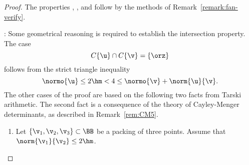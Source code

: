 \begin{proof}
The properties , , and  follow
by the methods of Remark~\ref{remark:fan-verify}.

: Some geometrical reasoning is required to
establish the intersection property.  The case
\[ 
C\{\u\}\cap C\{\v\} = \{\orz\}
\] 
follows from the strict triangle inequality 
\[ 
\normo{\u} \le 2\hm < 4 \le \normo{\v} + \norm{\u}{\v}.
\] 
The other cases of the proof are based on the following two facts from
Tarski arithmetic.  The second fact is a consequence of the theory of
Cayley-Menger determinants, as described in Remark~\ref{rem:CM5}.
\begin{enumerate}
\item {} Let $\{\v_1,\v_2,\v_3\}\subset \BB$ be a
  packing of three points.  Assume that $\norm{\v_1}{\v_2}\le 2\hm$.

\end{enumerate}
\end{proof}
